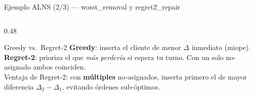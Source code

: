 \documentclass[aspectratio=169,10pt]{beamer}
\begin{document}
\begin{frame}{Ejemplo ALNS (2/3) --- worst\_removal y regret2\_repair}
\begin{columns}[T,onlytextwidth]
\begin{column}{0.48\textwidth}
      \vspace{0.4em}
      \begin{block}{Greedy vs.\ Regret-2}\footnotesize
        \textbf{Greedy}: inserta el cliente de menor $\Delta$ inmediato (miope).\\[0.3em]
        \textbf{Regret-2}: prioriza el que \textit{más perdería} si espera tu turno. Con un solo no-asignado ambos coinciden.\\[0.3em]
        Ventaja de Regret-2: con \textbf{múltiples} no-asignados, inserta primero el de mayor diferencia $\Delta_2{-}\Delta_1$, evitando órdenes sub-óptimos.
      \end{block}
    \end{column}
  \end{columns}
\end{frame}
\end{document}
